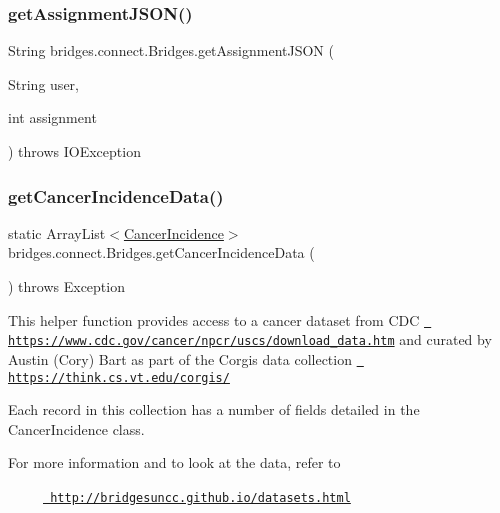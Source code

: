 \subsubsection{\texorpdfstring{getAssignmentJSON()}{getAssignmentJSON()}\hspace{0.1cm}{\footnotesize\ttfamily [2/2]}}
{\footnotesize\ttfamily String bridges.\+connect.\+Bridges.\+get\+Assignment\+J\+S\+ON (\begin{DoxyParamCaption}\item[{String}]{user,  }\item[{int}]{assignment }\end{DoxyParamCaption}) throws I\+O\+Exception}

\mbox{\label{classbridges_1_1connect_1_1_bridges_ad3d3afcf9df9e2b87d069bc050029628}} 
\subsubsection{\texorpdfstring{getCancerIncidenceData()}{getCancerIncidenceData()}}
{\footnotesize\ttfamily static Array\+List$<$\mbox{\hyperlink{classbridges_1_1data__src__dependent_1_1_cancer_incidence}{Cancer\+Incidence}}$>$ bridges.\+connect.\+Bridges.\+get\+Cancer\+Incidence\+Data (\begin{DoxyParamCaption}{ }\end{DoxyParamCaption}) throws Exception\hspace{0.3cm}{\ttfamily [static]}}

This helper function provides access to a cancer dataset from C\+DC \href{https://www.cdc.gov/cancer/npcr/uscs/download_data.htm}{\texttt{ https\+://www.\+cdc.\+gov/cancer/npcr/uscs/download\+\_\+data.\+htm}} and curated by Austin (Cory) Bart as part of the Corgis data collection \href{https://think.cs.vt.edu/corgis/}{\texttt{ https\+://think.\+cs.\+vt.\+edu/corgis/}}

Each record in this collection has a number of fields detailed in the Cancer\+Incidence class.

For more information and to look at the data, refer to 

~~~~~\href{http://bridgesuncc.github.io/datasets.html}{\texttt{ http\+://bridgesuncc.\+github.\+io/datasets.\+html}} 


